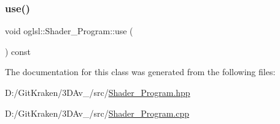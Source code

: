 \mbox{\label{classoglsl_1_1_shader___program_ad68bd3ebd1b96464cb5708588e050044}} 
\subsubsection{\texorpdfstring{use()}{use()}}
{\footnotesize\ttfamily void oglsl\+::\+Shader\+\_\+\+Program\+::use (\begin{DoxyParamCaption}{ }\end{DoxyParamCaption}) const\hspace{0.3cm}{\ttfamily [inline]}}



The documentation for this class was generated from the following files\+:\begin{DoxyCompactItemize}
\item 
D\+:/\+Git\+Kraken/3\+D\+Av\+\_/src/\mbox{\hyperlink{_shader___program_8hpp}{Shader\+\_\+\+Program.\+hpp}}\item 
D\+:/\+Git\+Kraken/3\+D\+Av\+\_/src/\mbox{\hyperlink{_shader___program_8cpp}{Shader\+\_\+\+Program.\+cpp}}\end{DoxyCompactItemize}
